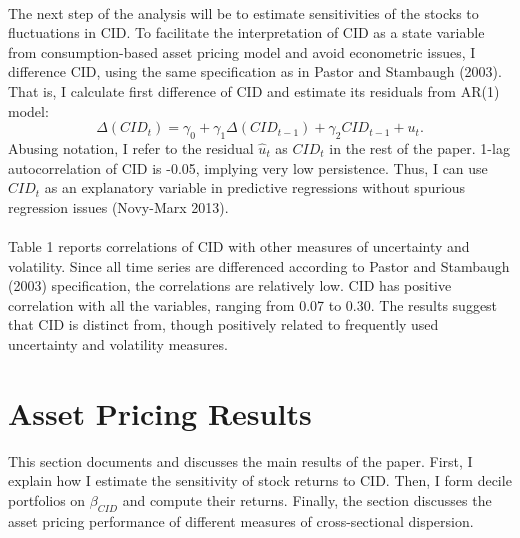 \documentclass[12pt]{article}
\begin{document}
\paragraph{}
The next step of the analysis will be to estimate sensitivities of the stocks to fluctuations in CID. To facilitate the interpretation of CID as a state variable from consumption-based asset pricing model and avoid econometric issues, I difference CID, using the same specification as in Pastor and Stambaugh (2003). That is, I calculate first difference of CID and estimate its residuals from AR(1) model:
\begin{equation}
\Delta(CID_t) = \gamma_0 + \gamma_1 \Delta(CID_{t-1}) + \gamma_2 CID_{t-1} + u_t.
\end{equation}
Abusing notation, I refer to the residual $\hat{u}_t$ as $CID_t$ in the rest of the paper. 1-lag autocorrelation of CID is -0.05, implying very low persistence. Thus, I can use $CID_t$ as an explanatory variable in predictive regressions without spurious regression issues (Novy-Marx 2013). 
\paragraph{}
Table 1 reports correlations of CID with other measures of uncertainty and volatility. Since all time series are differenced according to Pastor and Stambaugh (2003) specification, the correlations are relatively low. CID has positive correlation with all the variables, ranging from 0.07 to 0.30. The results suggest that CID is distinct from, though positively related to frequently used uncertainty and volatility measures.

\section{Asset Pricing Results} \label{sec:Model}

This section documents and discusses the main results of the paper. First, I explain how I estimate the sensitivity of stock returns to CID. Then, I form decile portfolios on $\beta_{CID}$ and compute their returns. Finally, the section discusses the asset pricing performance of different measures of cross-sectional dispersion.
\end{document}
